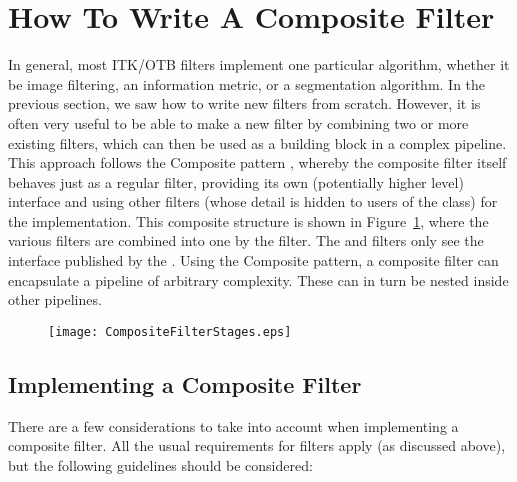 
\section{How To Write A Composite Filter}

In general, most ITK/OTB filters implement one particular algorithm,
whether it be image filtering, an information metric, or a
segmentation algorithm.  In the previous section, we saw how to write
new filters from scratch.  However, it is often very useful to be able
to make a new filter by combining two or more existing filters, which
can then be used as a building block in a complex pipeline.  This
approach follows the Composite pattern \cite{Gamma1995}, whereby the
composite filter itself behaves just as a regular filter, providing
its own (potentially higher level) interface and using other filters
(whose detail is hidden to users of the class) for the implementation.
This composite structure is shown in
Figure~\ref{fig:CompositeFilterStages}, where the various
 filters are combined into one by the 
filter.  The  and  filters only see the
interface published by the .  Using the Composite
pattern, a composite filter can encapsulate a pipeline of arbitrary
complexity.  These can in turn be nested inside other pipelines.

\begin{figure}
  \centering
  \texttt{[image: CompositeFilterStages.eps]}
  \label{fig:CompositeFilterStages}
\end{figure}

\subsection{Implementing a Composite Filter}

There are a few considerations to take into account when implementing a
composite filter.  All the usual requirements for filters apply (as
discussed above), but the following guidelines should be considered:

